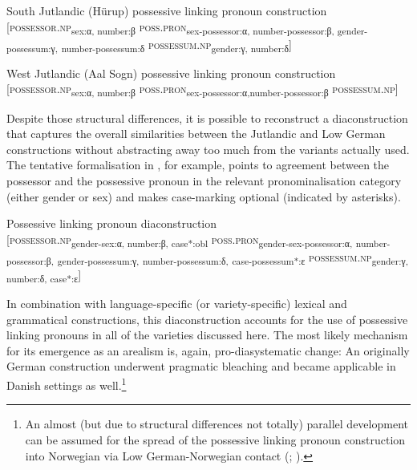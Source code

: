 \documentclass[output=paper]{langsci/langscibook}
\begin{document}
%
 
\ea\label{ex:hoeder:18}
	\ea\label{ex:hoeder:18a}
	South Jutlandic (Hürup) possessive linking pronoun construction\\
     {[}\textsc{possessor.np}\textsubscript{sex:α, number:β} \textsc{poss.pron}\textsubscript{sex-possessor:α, number-possessor:β, gender-possessum:γ,} \textsubscript{number-possessum:δ} \textsc{possessum.np}\textsubscript{gender:γ, number:δ}{]}

	\ex\label{ex:hoeder:18b}
	 West Jutlandic (Aal Sogn) possessive linking pronoun construction\\
     {[}\textsc{possessor.np}\textsubscript{sex:α, number:β} \textsc{poss.pron}\textsubscript{sex-possessor:α,}\textsubscript{number-possessor:β} \textsc{possessum.np}{]}
     \z
     \z
     
Despite those structural differences, it is possible to reconstruct a diaconstruction that captures the overall similarities between the Jutlandic and Low German constructions without abstracting away too much from the variants actually used. The tentative formalisation in , for example, points to agreement between the possessor and the possessive pronoun in the relevant pronominalisation category (either gender or sex) and makes case-marking optional (indicated by asterisks).

\ea\label{ex:hoeder:19}
	Possessive linking pronoun diaconstruction\\
     {[}\textsc{possessor.np}\textsubscript{gender-sex:α, number:β, case*:obl} \textsc{poss.pron}\textsubscript{gender-sex-possessor:α,} \textsubscript{number-possessor:β,} \textsubscript{gender-possessum:γ,} \textsubscript{number-possessum:δ,} \textsubscript{case-possessum*:ε} \textsc{possessum.np}\textsubscript{gender:γ, number:δ, case*:ε}{]}
 \z
 
 
In combination with language-specific (or variety-specific) lexical and grammatical constructions, this diaconstruction accounts for the use of possessive linking pronouns in all of the varieties discussed here. The most likely mechanism for its emergence as an arealism is, again, pro-diasystematic change: An originally German construction underwent pragmatic bleaching and became applicable in Danish settings as well.\footnote{An almost (but due to structural differences not totally) parallel development can be assumed for the spread of the possessive linking pronoun construction into Norwegian via Low German-Norwegian contact (\citealt[119]{Hoder.2016a}; \citealt{Nesse.1998}).}
\end{document}
